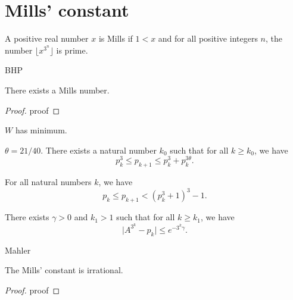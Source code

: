 %

\chapter{Mills' constant}

\begin{definition}
    \label{def:mills}
    A positive real number $x$ is Mills if $1 < x$ and
    for all positive integers $n$, the number $\lfloor x^{3^n} \rfloor$ is prime.
\end{definition}

\begin{theorem}
    BHP
\end{theorem}

\begin{proposition}
    \label{prop:mills}
    There exists a Mills number.
\end{proposition}

\begin{proof}
    proof
\end{proof}

\begin{proposition}
    $W$ has minimum.
\end{proposition}

\begin{proposition}
    $\theta = 21/40$.
    There exists a natural number $k_0$ such that for all $k \geq k_0$, we have
    $$
    p_k^3 \leq p_{k+1} \leq p_k^3 + p_k^{3\theta}.
    $$
\end{proposition}

\begin{lemma}
    For all natural numbers $k$, we have
    $$
    p_k \leq p_{k+1} < (p_k^3 + 1)^3 - 1.
    $$
\end{lemma}

\begin{lemma}
    There exists $\gamma > 0$ and $k_1 > 1$ such that for all $k \geq k_1$, we have
    $$
    \lvert A ^ 3 ^ k - p_k\rvert \leq e^{-3^k\gamma}.
    $$
\end{lemma}

\begin{theorem}
    Mahler
\end{theorem}

\begin{theorem}
    \label{thm:mills_irrational}
    The Mills' constant is irrational.    
\end{theorem}

\begin{proof}
    proof
\end{proof}